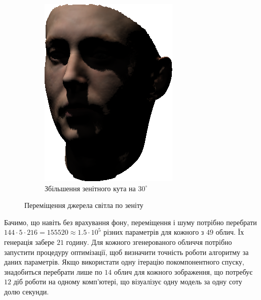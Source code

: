 \begin{figure}[h]
\begin{subfigure}[b]{0.4\textwidth}
    \includegraphics[width=\textwidth]{images/face_shaded_4}
    \caption{Збільшення зенітного кута на $30^{\circ}$}
  \end{subfigure}
  \caption{Переміщення джерела світла по зеніту}
  \label{fig:practice:shadows-angles-zenith}
\end{figure}

Бачимо, що навіть без врахування фону, переміщення і шуму потрібно перебрати
$144 \cdot 5 \cdot 216 = 155520 \approx 1.5 \cdot 10^{5}$ різних параметрів
для кожного з $49$ облич.
Їх генерація забере $21$ годину.
Для кожного згенерованого обличчя потрібно запустити процедуру оптимізації,
щоб визначити точність роботи алгоритму за даних параметрів.
Якщо використати одну ітерацію покомпонентного спуску,
знадобиться перебрати лише по $14$ облич для кожного зображення,
що потребує $12$ діб роботи на одному комп'ютері,
що візуалізує одну модель за одну соту долю секунди.

